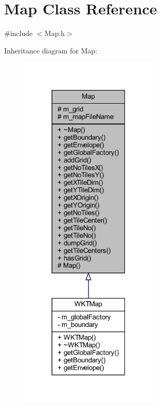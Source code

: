 \hypertarget{class_map}{}\section{Map Class Reference}
\label{class_map}


{\ttfamily \#include $<$Map.\+h$>$}



Inheritance diagram for Map\+:\nopagebreak
\begin{figure}[H]
\begin{center}
\leavevmode
\includegraphics[width=186pt]{class_map__inherit__graph}
\end{center}
\end{figure}


